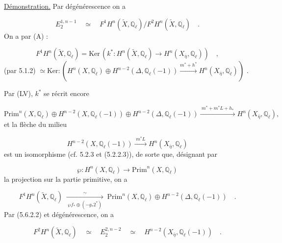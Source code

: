 \underline{Démonstration.} Par dégénérescence on a

\begin{equation*}
E_2^{1,n-1} \quad \simeq \quad F^1 H^n(\tilde{X},\mathbb{Q}_\ell) \Big/ F^2 H^n(\tilde{X},\mathbb{Q}_\ell) \quad .
\end{equation*}
On a par (A) :

\begin{equation}\tag{5.7.2}
F^1 H^n(\tilde{X},\mathbb{Q}_\ell) = \mathrm{Ker}\,(k^* : H^n(\tilde{X},\mathbb{Q}_\ell) \longrightarrow H^n(X_{\bar{\eta}},\mathbb{Q}_\ell)) \quad ,
\end{equation}
(par 5.1.2) $\simeq \mathrm{Ker}: (H^n(X,\mathbb{Q}_\ell) \oplus H^{n-2}(\Delta,\mathbb{Q}_\ell(-1)) \xrightarrow{m^*+h^*} H^n(X_{\bar{\eta}},\mathbb{Q}_\ell))$ .

Par (LV), $k^*$ se récrit encore

\begin{equation}\tag{5.7.3}
\mathrm{Prim}^n(X,\mathbb{Q}_\ell) \oplus H^{n-2}(X,\mathbb{Q}_\ell(-1)) \oplus H^{n-2}(\Delta,\mathbb{Q}_\ell(-1)) \xrightarrow{\;m^*+m^*L+h_*\;} H^n(X_{\bar{\eta}},\mathbb{Q}_\ell),
\end{equation}
et la flèche du milieu

\begin{equation}\tag{5.7.4}
H^{n-2}(X,\mathbb{Q}_\ell(-1)) \xrightarrow{\;m^*L\;} H^n(X_{\bar{\eta}},\mathbb{Q}_\ell)
\end{equation}
est un isomorphisme (cf. 5.2.3 et (5.2.2.3)), de sorte que, désignant par

\begin{equation}\tag{5.7.5}
\wp : H^n(X,\mathbb{Q}_\ell) \longrightarrow \mathrm{Prim}^n(X,\mathbb{Q}_\ell)
\end{equation}
la projection sur la partie primitive, on a

\begin{equation}\tag{5.7.6}
F^1 H^n(\tilde{X},\mathbb{Q}_\ell) \;\xrightarrow[\;\wp f_*\oplus(-g_*2^*)\;]{\sim}\; \mathrm{Prim}^n(X,\mathbb{Q}_\ell) \oplus H^{n-2}(\Delta,\mathbb{Q}_\ell(-1)) \quad .
\end{equation}
Par (5.6.2.2) et dégénérescence, on a

\begin{equation}\tag{5.7.7}
F^2 H^n(\tilde{X},\mathbb{Q}_\ell) \quad \simeq \quad E_2^{2,n-2} \quad \simeq \quad H^{n-2}(X_{\bar{\eta}},\mathbb{Q}_\ell(-1)) \quad .
\end{equation}


